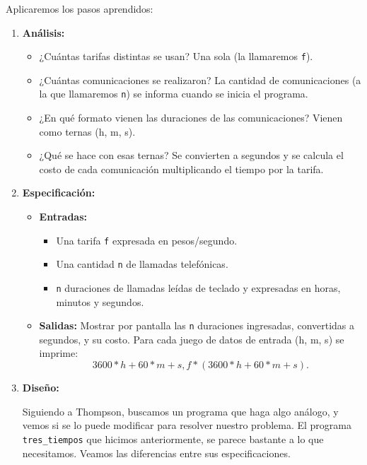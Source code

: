 \begin{solucion}
Aplicaremos los pasos aprendidos:

\begin{enumerate}

\item {\bf Análisis: }
\begin{itemize}
\item ¿Cuántas tarifas distintas se usan? Una sola (la llamaremos \lstinline!f!).
\item ¿Cuántas comunicaciones se realizaron? La cantidad de comunicaciones (a
la que llamaremos \lstinline!n!) se informa cuando se inicia el programa.
\item ¿En qué formato vienen las duraciones de las comunicaciones? Vienen como ternas (h, m, s).
\item ¿Qué se hace con esas ternas? Se convierten a segundos y se calcula el costo de cada
comunicación multiplicando el tiempo por la tarifa.
\end{itemize}

\item {\bf Especificación: }
\begin{itemize}

\item {\bf Entradas: }
\begin{itemize}
\item Una tarifa \lstinline+f+ expresada en pesos/segundo.
\item Una cantidad \lstinline+n+ de llamadas telefónicas.
\item \lstinline+n+ duraciones de llamadas leídas de teclado y expresadas en horas, minutos y segundos.
\end{itemize}

\item {\bf Salidas: } Mostrar por pantalla las \lstinline+n+ duraciones ingresadas, convertidas a segundos,
y su costo.
Para cada juego de datos de entrada (h, m, s) se imprime:
\begin{displaymath}
3600 * h + 60 * m + s, f * (3600 * h + 60 * m + s) .
\end{displaymath}
\end{itemize}

\item {\bf Diseño:}

Siguiendo a Thompson, buscamos un programa que haga algo análogo, y vemos si se
lo puede modificar para resolver nuestro problema.  El programa
\lstinline+tres_tiempos+ que hicimos anteriormente,  se parece bastante a lo
que necesitamos. Veamos las diferencias entre sus especificaciones.


\end{enumerate}
\end{solucion}
